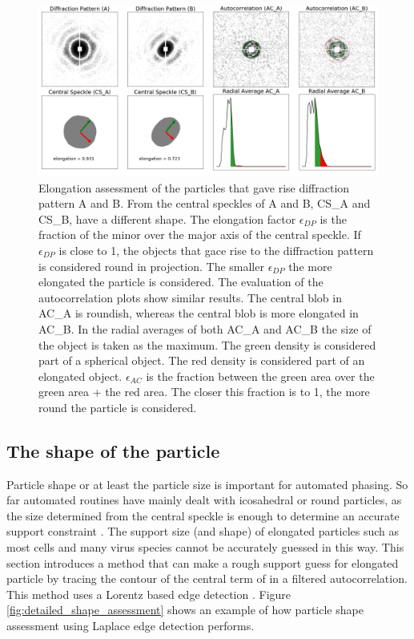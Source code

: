 \begin{figure}[h]
\centering
\includegraphics[width=120mm]{Chapter_08_ImageClassification_shape_assessment.png}
\caption{Elongation assessment of the particles that gave rise diffraction pattern A and B. From the central speckles of A and B, CS\_A and CS\_B, have a different shape. The elongation factor $\epsilon_{DP}$ is the fraction of the minor over the major axis of the central speckle. If $\epsilon_{DP}$ is close to 1, the objects that gace rise to the diffraction pattern is considered round in projection. The smaller $\epsilon_{DP}$ the more elongated the particle is considered. The evaluation of the autocorrelation plots show similar results. The central blob in AC\_A is roundish, whereas the central blob is more elongated in AC\_B. In the radial averages of both AC\_A and AC\_B the size of the object is taken as the maximum. The green density is considered part of a spherical object. The red density is considered part of an elongated object. $\epsilon_{AC}$ is the fraction between the green area over the green area + the red area. The closer this fraction is to 1, the more round the particle is considered.}\label{fig:shape_assessment}
\end{figure}


\subsection{The shape of the particle}
Particle shape or at least the particle size is important for automated phasing. So far automated routines have mainly dealt with icosahedral or round particles, as the size determined from the central speckle is enough to determine an accurate support constraint \cite{Hantke2014,Daurer2017}. The support size (and shape) of elongated particles such as most cells and many virus species cannot be accurately guessed in this way. This section introduces a method that can make a rough support guess for elongated particle by tracing the contour of the central term of in a filtered autocorrelation. This method uses a Lorentz based edge detection \cite{mathworks2018}.
Figure \ref{fig:detailed_shape_assessment} shows an example of how particle shape assessment using Laplace edge detection performs.

